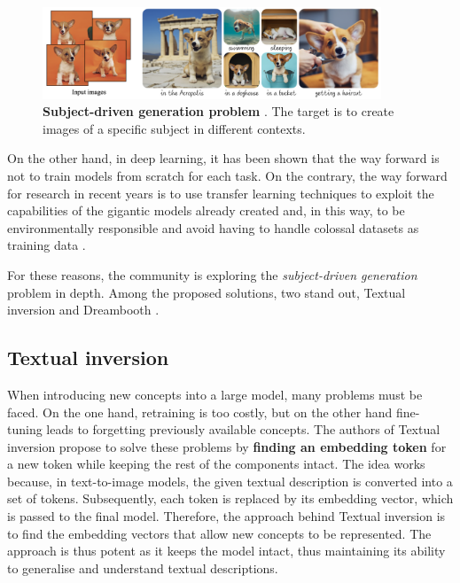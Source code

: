 \begin{figure}
    \centering
    \includegraphics[width=0.9\textwidth]{Pictures/subjectD.png} 
    \caption{\textbf{Subject-driven generation problem} \cite{ruiz2022dreambooth}. The target is to create images of a specific subject in different contexts.}
    \label{fig:subjectD}
\end{figure}

On the other hand, in deep learning, it has been shown that the way forward is not to train models from scratch for each task. On the contrary, the way forward for research in recent years is to use transfer learning techniques to exploit the capabilities of the gigantic models already created and, in this way, to be environmentally responsible and avoid having to handle colossal datasets as training data \cite{zhuang2020comprehensive}.

For these reasons, the community is exploring the \textit{subject-driven generation} problem in depth. Among the proposed solutions, two stand out, Textual inversion \cite{gal2022image} and Dreambooth \cite{ruiz2023dreambooth}.

\subsection{Textual inversion}

When introducing new concepts into a large model, many problems must be faced. On the one hand, retraining is too costly, but on the other hand fine-tuning leads to forgetting previously available concepts. The authors of Textual inversion propose to solve these problems by \textbf{finding an embedding token} for a new token while keeping the rest of the components intact. The idea works because, in text-to-image models, the given textual description is converted into a set of tokens. Subsequently, each token is replaced by its embedding vector, which is passed to the final model. Therefore, the approach behind Textual inversion is to find the embedding vectors that allow new concepts to be represented. The approach is thus potent as it keeps the model intact, thus maintaining its ability to generalise and understand textual descriptions. 

